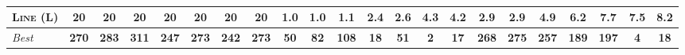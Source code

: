\documentclass[11pt,landscape]{article}
\begin{document}
\begin{table*}[tb]
{\begin{tabular}{|l||ccccccc||ccccccc||ccccccc||}
\textsc{Line} (L)&\textbf{20}&\textbf{20}&\textbf{20}&\textbf{20}&\textbf{20}&\textbf{20}&\textbf{20}&\textbf{1.0}&\textbf{1.0}&1.1&2.4&2.6&4.3&4.2&\textbf{2.9}&\textbf{2.9}&4.9&6.2&7.7&7.5&8.2
\\\hline
\textit{Best}&\textbf{270}&\textbf{283}&\textbf{311}&\textbf{247}&\textbf{273}&\textbf{242}&\textbf{273}&\textbf{50}&\textbf{82}&\textbf{108}&\textbf{18}&\textbf{51}&\textbf{2}&\textbf{17}&\textbf{268}&\textbf{275}&\textbf{257}&\textbf{189}&\textbf{197}&\textbf{4}&\textbf{18}\\\hline

        \end{tabular}}
        \caption{}
        \label{tab:all-patty}
        \end{table*}
        
\end{document}
